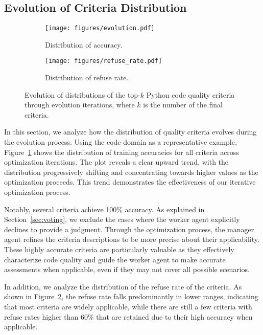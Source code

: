 \subsection{Evolution of Criteria Distribution}

\begin{figure*}[htbp]
    \centering
    \begin{subfigure}
        [b]{0.48\textwidth}
        \texttt{[image: figures/evolution.pdf]}
        \caption{Distribution of accuracy.}
        \label{fig:evolution_acc}
    \end{subfigure}
    \hfill
    \begin{subfigure}
        [b]{0.48\textwidth}
        \texttt{[image: figures/refuse\_rate.pdf]}
        \caption{Distribution of refuse rate.}
        \label{fig:evolution_refuse_rate}
    \end{subfigure}
    \caption{Evolution of distributions of the top-$k$ Python code quality
    criteria through evolution iterations, where $k$ is the number of the final criteria.}
    \label{fig:criteria_evolution}
\end{figure*}

In this section, we analyze how the distribution of quality criteria evolves during
the evolution process. Using the code domain as a representative example, Figure~\ref{fig:evolution_acc}
shows the distribution of training accuracies for all criteria across optimization
iterations. The plot reveals a clear upward trend, with the distribution progressively
shifting and concentrating towards higher values as the optimization proceeds.
This trend demonstrates the effectiveness of our iterative optimization process.

Notably, several criteria achieve 100\% accuracy. As explained in Section~\ref{sec:voting},
we exclude the cases where the worker agent explicitly declines to provide a
judgment. Through the optimization process, the manager agent refines the
criteria descriptions to be more precise about their applicability. These highly
accurate criteria are particularly valuable as they effectively characterize code
quality and guide the worker agent to make accurate assessments when applicable,
even if they may not cover all possible scenarios.

In addition, we analyze the distribution of the refuse rate of the criteria. As
shown in Figure~\ref{fig:evolution_refuse_rate}, the refuse rate falls predominantly
in lower ranges, indicating that most criteria are widely applicable, while there
are still a few criteria with refuse rates higher than 60\% that are retained
due to their high accuracy when applicable.

